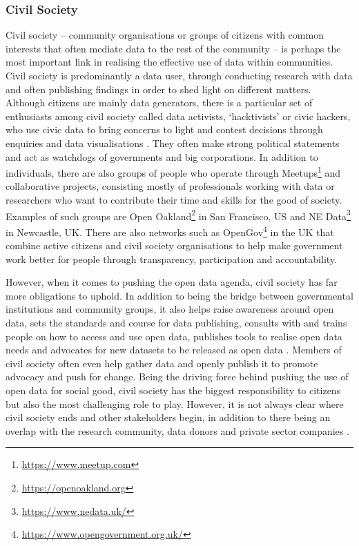\subsubsection{Civil Society}
Civil society -- community organisations or groups of citizens with common interests that often mediate data to the rest of the community -- is perhaps the most important link in realising the effective use of data within communities. Civil society is predominantly a data user, through conducting research with data and often publishing findings in order to shed light on different matters. Although citizens are mainly data generators, there is a particular set of enthusiasts among civil society called data activists, `hacktivists' or civic hackers, who use civic data to bring concerns to light and contest decisions through enquiries and data visualisations \citep{taylor_hackers_2005,schrock_civic_2016}. They often make strong political statements and act as watchdogs of governments and big corporations. In addition to individuals, there are also groups of people who operate through Meetups\footnote{\url{https://www.meetup.com}} and collaborative projects, consisting mostly of professionals working with data or researchers who want to contribute their time and skills for the good of society. Examples of such groups are Open Oakland\footnote{\url{https://openoakland.org}} in San Francisco, US and NE Data\footnote{\url{https://www.nedata.uk/}} in Newcastle, UK. There are also networks such as OpenGov\footnote{\url{https://www.opengovernment.org.uk/}} in the UK that combine active citizens and civil society organisations to help make government work better for people through transparency, participation and accountability.

However, when it comes to pushing the open data agenda, civil society has far more obligations to uphold. In addition to being the bridge between governmental institutions and community groups, it also helps raise awareness around open data, sets the standards and course for data publishing, consults with and trains people on how to access and use open data, publishes tools to realise open data needs and advocates for new datasets to be released as open data \citep[ch. 24]{davies_open_2010}. Members of civil society often even help gather data and openly publish it to promote advocacy and push for change. Being the driving force behind pushing the use of open data for social good, civil society has the biggest responsibility to citizens but also the most challenging role to play. However, it is not always clear where civil society ends and other stakeholders begin, in addition to there being an overlap with the research community, data donors and private sector companies \citep[sec. 3]{davies_open_2010}.

